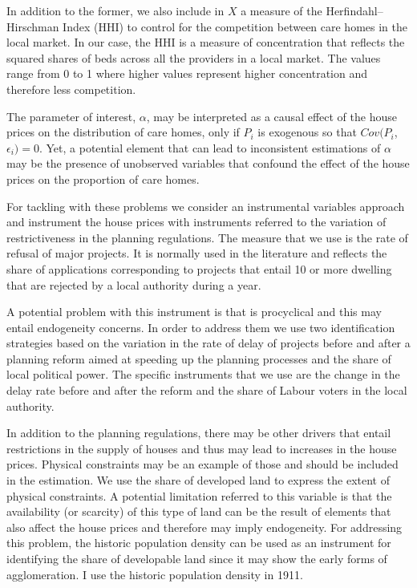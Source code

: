 \documentclass[12pt,letterpaper]{article}
\begin{document}
      In addition to the former, we also include in $X$ a measure of the Herfindahl–Hirschman Index (HHI) to control for
      the competition between care homes in the local market. In our case, the HHI is a measure of concentration that 
      reflects the squared shares of beds across all the providers in a local market. The values range from
       0 to 1 where higher values represent higher concentration and therefore less competition.  
 
The parameter of interest, $\alpha$,  may be interpreted as a causal effect
  of the house prices on the distribution of care homes, only if
         $P_i$ is exogenous so that $Cov(P_{i}$,$\epsilon_{i}) = 0 $. Yet, a potential element that can lead 
         to inconsistent estimations of $\alpha$ may be the presence of unobserved
 variables that confound the effect of the house prices on the proportion of care homes.

 For tackling with these problems we consider an instrumental variables approach and instrument the house prices with 
instruments referred to the variation of 
 restrictiveness in the planning regulations. The measure that we use is the 
 rate of refusal of major projects. It is normally used in the literature and 
 reflects the share of applications corresponding to projects that entail 10 or more 
 dwelling that are rejected by a local authority during a year. 
 
 A potential problem with this instrument is that is procyclical and this may 
 entail endogeneity concerns. In order to address them we use two identification 
 strategies based on the 
 variation in the rate of delay of projects before and after a planning reform aimed at speeding up the planning processes 
 and the share of local political power. The specific instruments that we use are the 
change in the delay rate before and after the reform and the share of Labour 
voters in the local authority. 

In addition to the planning regulations, there may be other drivers that entail 
restrictions in the supply of houses and thus may lead to increases in the house 
prices. Physical constraints may be an example of those and should be included in the 
estimation. We use the share of developed land to express the extent of physical 
constraints. A potential limitation referred to this variable is that 
  the availability (or scarcity) of this type of land can be the result of elements that 
  also affect the house prices and therefore may imply endogeneity. For 
  addressing this problem, the historic population density can be used as an 
  instrument for identifying the share of developable land since it may show the 
  early forms of agglomeration. I use the historic population density in 1911.
\end{document}
